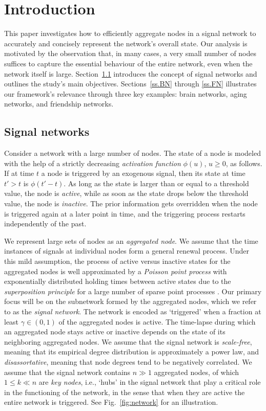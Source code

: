 \documentclass[11pt]{article}
\numberwithin{equation}{section}
\begin{document}

\section{Introduction}

This paper investigates how to efficiently aggregate nodes in a signal network to accurately and concisely represent the network's overall state. Our analysis is motivated by the observation that, in many cases, a very small number of nodes suffices to capture the essential behaviour of the entire network, even when the network itself is large. Section~\ref{ss.SN} introduces the concept of signal networks and outlines the study's main objectives. Sections~\ref{ss.BN} through \ref{ss.FN} illustrates our framework's relevance through three key examples: brain networks, aging networks, and friendship networks.


\subsection{Signal networks}\label{ss.SN}

Consider a network with a large number of nodes. The state of a node is modeled with the help of a strictly decreasing {\em activation function} $\phi (u)$, $u \geq 0$, as follows. If at time $t$ a node is triggered by an exogenous signal, then its state at time $t' > t$ is $\phi (t' - t)$. As long as the state is larger than or equal to a threshold value, the node is {\em active}, while as soon as the state drops below the threshold value, the node is {\em inactive}. The prior information gets overridden when the node is triggered again at a later point in time, and the triggering process restarts independently of the past.

We represent large sets of nodes as an {\em aggregated node}. We assume that the time instances of signals at individual nodes form a general renewal process. Under this mild assumption, the process of active versus inactive states for the aggregated nodes is well approximated by a {\em Poisson point process} with exponentially distributed holding times between active states due to the {\em superposition principle} for a large number of sparse point processes \cite[Theorem 3.1]{Aging}. Our primary focus will be on the subnetwork formed by the aggregated nodes, which we refer to as the {\em signal network}. The network is encoded as `triggered' when a fraction at least $\gamma \in (0,1)$ of the aggregated nodes is active. The time-lapse during which an aggregated node stays active or inactive depends on the state of its neighboring aggregated nodes. We assume that the signal network is \textit{scale-free}, meaning that its empirical degree distribution is approximately a power law, and \textit{disassortative}, meaning that node degrees tend to be negatively correlated. We assume that the signal network contains $n \gg 1$ aggregated nodes, of which $1 \leq k \ll n$ are {\em key nodes}, i.e., `hubs' in the signal network that play a critical role in the functioning of the network, in the sense that when they are active the entire network is triggered. See Fig.\ \ref{fig:network} for an illustration.
 
\end{document}
